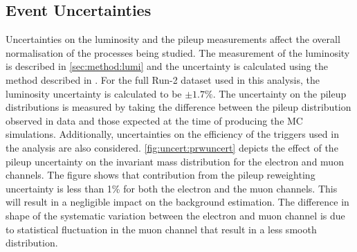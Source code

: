 \subsection{Event Uncertainties}
Uncertainties on the luminosity and the pileup measurements affect the overall normalisation of the processes being studied. The measurement of the luminosity is described in \cref{sec:method:lumi} and the uncertainty is calculated using the method described in \cite{Aaboud:2208146}. For the full Run-2 dataset used in this analysis, the luminosity uncertainty is calculated to be $\pm 1.7\%$. The uncertainty on the pileup distributions is measured by taking the difference between the pileup distribution observed in data and those expected at the time of producing the MC simulations. Additionally, uncertainties on the efficiency of the triggers used in the analysis are also considered.  \cref{fig:uncert:prwuncert} depicts the effect of the pileup uncertainty on the invariant mass distribution for the electron and muon channels. The figure shows that contribution from the pileup reweighting uncertainty is less than 1\% for both the electron and the muon channels. This will result in a negligible impact on the background estimation. The difference in shape of the systematic variation between the electron and muon channel is due to statistical fluctuation in the muon channel that result in a less smooth distribution. 

